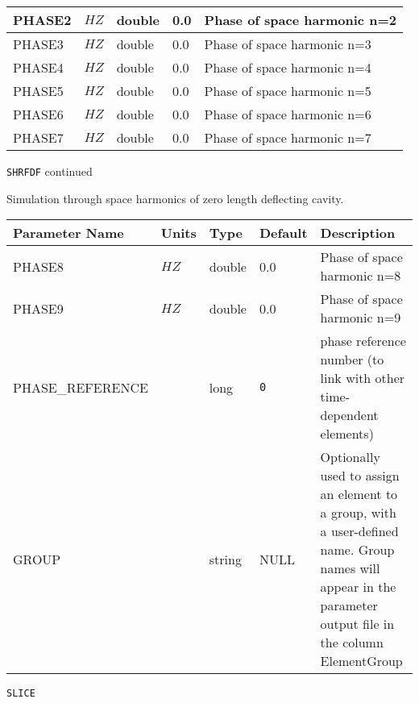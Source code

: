 \begin{tabular}{|l|l|l|l|p{\descwidth}|}
PHASE2 & $HZ$ & double &  0.0 & Phase of space harmonic n=2  \\ \hline 
PHASE3 & $HZ$ & double &  0.0 & Phase of space harmonic n=3  \\ \hline 
PHASE4 & $HZ$ & double &  0.0 & Phase of space harmonic n=4  \\ \hline 
PHASE5 & $HZ$ & double &  0.0 & Phase of space harmonic n=5  \\ \hline 
PHASE6 & $HZ$ & double &  0.0 & Phase of space harmonic n=6  \\ \hline 
PHASE7 & $HZ$ & double &  0.0 & Phase of space harmonic n=7  \\ \hline 
\end{tabular}

\newpage
\begin{center}{\Large\verb|SHRFDF| continued}\end{center}
Simulation through space harmonics of zero length deflecting cavity.
\\
\begin{tabular}{|l|l|l|l|p{\descwidth}|} \hline
Parameter Name & Units & Type & Default & Description \\ \hline 
PHASE8 & $HZ$ & double &  0.0 & Phase of space harmonic n=8  \\ \hline 
PHASE9 & $HZ$ & double &  0.0 & Phase of space harmonic n=9  \\ \hline 
PHASE\_REFERENCE &  & long &  \verb|0| & phase reference number (to link with other time-dependent elements)  \\ \hline 
GROUP &  & string & NULL & Optionally used to assign an element to a group, with a user-defined name.  Group names will appear in the parameter output file in the column ElementGroup  \\ \hline 
\end{tabular}

\vspace*{0.5in}

\newpage
\begin{center}{\Large\verb|SLICE|}\end{center}
